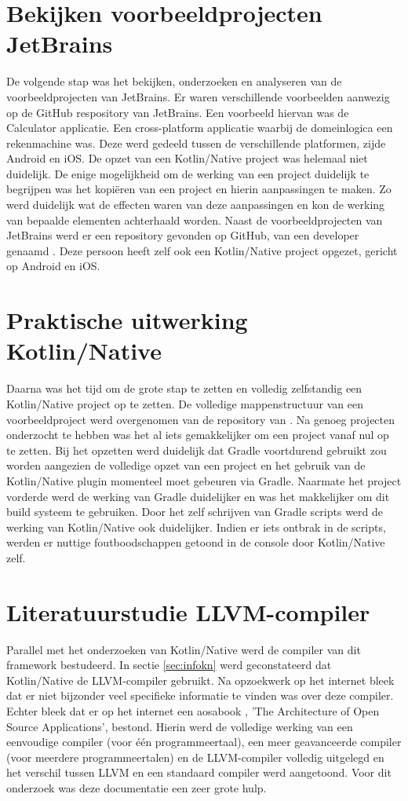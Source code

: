 \section{Bekijken voorbeeldprojecten JetBrains}
De volgende stap was het bekijken, onderzoeken en analyseren van de voorbeeldprojecten van JetBrains. Er waren verschillende voorbeelden aanwezig op de GitHub respository van JetBrains. Een voorbeeld hiervan was de Calculator applicatie. Een cross-platform applicatie waarbij de domeinlogica een rekenmachine was. Deze werd gedeeld tussen de verschillende platformen, zijde Android en iOS. De opzet van een Kotlin/Native project was helemaal niet duidelijk. De enige mogelijkheid om de werking van een project duidelijk te begrijpen was het kopiëren van een project en hierin aanpassingen te maken. Zo werd duidelijk wat de effecten waren van deze aanpassingen en kon de werking van bepaalde elementen achterhaald worden. Naast de voorbeeldprojecten van JetBrains werd er een repository gevonden op GitHub, van een developer genaamd \textcite{AlbertGao}. Deze persoon heeft zelf ook een Kotlin/Native project opgezet, gericht op Android en iOS.

\section{Praktische uitwerking Kotlin/Native}
Daarna was het tijd om de grote stap te zetten en volledig zelfstandig een Kotlin/Native project op te zetten. De volledige mappenstructuur van een voorbeeldproject werd overgenomen van de repository van \textcite{AlbertGao}. Na genoeg projecten onderzocht te hebben was het al iets gemakkelijker om een project vanaf nul op te zetten. Bij het opzetten werd duidelijk dat Gradle voortdurend gebruikt zou worden aangezien de volledige opzet van een project en het gebruik van de Kotlin/Native plugin momenteel moet gebeuren via Gradle. Naarmate het project vorderde werd de werking van Gradle duidelijker en was het makkelijker om dit build systeem te gebruiken. Door het zelf schrijven van Gradle scripts werd de werking van Kotlin/Native ook duidelijker. Indien er iets ontbrak in de scripts, werden er nuttige foutboodschappen getoond in de console door Kotlin/Native zelf.

\section{Literatuurstudie LLVM-compiler}
Parallel met het onderzoeken van Kotlin/Native werd de compiler van dit framework bestudeerd. In sectie \ref{sec:infokn} werd geconstateerd dat Kotlin/Native de LLVM-compiler gebruikt. Na opzoekwerk op het internet bleek dat er niet bijzonder veel specifieke informatie te vinden was over deze compiler. Echter bleek dat er op het internet een aosabook \autocite{aosa}, 'The Architecture of Open Source Applications', bestond. Hierin werd de volledige werking van een eenvoudige compiler (voor één programmeertaal), een meer geavanceerde compiler (voor meerdere programmeertalen) en de LLVM-compiler volledig uitgelegd en het verschil tussen LLVM en een standaard compiler werd aangetoond. Voor dit onderzoek was deze documentatie een zeer grote hulp.

